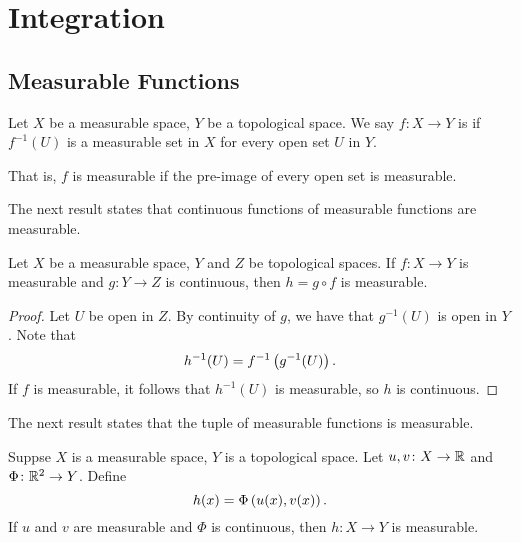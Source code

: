 \chapter{Integration}
\section{Measurable Functions}
\begin{definition}
Let $X$ be a measurable space, $Y$ be a topological space. We say $f\colon X\to Y$ is  if $f^{-1}(U)$ is a measurable set in $X$ for every open set $U$ in $Y$.
\end{definition}

That is, $f$ is measurable if the pre-image of every open set is measurable.

The next result states that continuous functions of measurable functions are measurable.

\begin{lemma}\label{lemma:composition-continuity}
Let $X$ be a measurable space, $Y$ and $Z$ be topological spaces. If $f\colon X\to Y$ is measurable and $g\colon Y\to Z$ is continuous, then $h=g\circ f$ is measurable.
\end{lemma}

\begin{proof}
Let $U$ be open in $Z$. By continuity of $g$, we have that $g^{-1}(U)$ is open in $Y$. Note that
\[h^{-1}(U)=f^{-1}\left(g^{-1}(U)\right).\]
If $f$ is measurable, it follows that $h^{-1}(U)$ is measurable, so $h$ is continuous.
\end{proof}

The next result states that the tuple of measurable functions is measurable.

\begin{lemma}\label{lemma:tuple-measurable-function}
Suppse $X$ is a measurable space, $Y$ is a topological space. Let $u,v\colon X\to\mathbb R$ and $\Phi\colon\mathbb R^2\to Y$. 
Define
\[h(x)=\Phi\left(u(x),v(x)\right).\]
If $u$ and $v$ are measurable and $\Phi$ is continuous, then $h\colon X\to Y$ is measurable.
\end{lemma}

